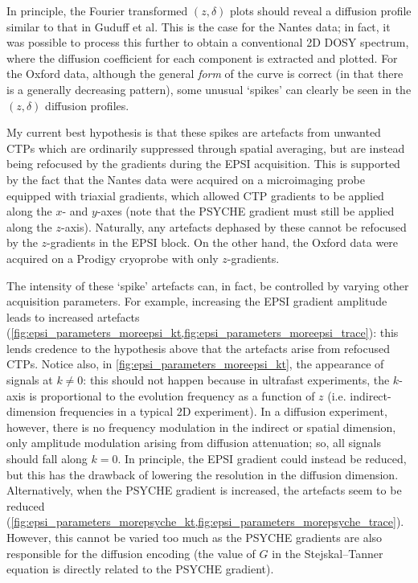 In principle, the Fourier transformed $(z, \delta)$ plots should reveal a diffusion profile similar to that in Guduff et al.\autocite{Guduff2017CC}
This is the case for the Nantes data; in fact, it was possible to process this further to obtain a conventional 2D DOSY spectrum, where the diffusion coefficient for each component is extracted and plotted.
For the Oxford data, although the general \textit{form} of the curve is correct (in that there is a generally decreasing pattern), some unusual `spikes' can clearly be seen in the $(z,\delta)$ diffusion profiles.

My current best hypothesis is that these spikes are artefacts from unwanted CTPs which are ordinarily suppressed through spatial averaging, but are instead being refocused by the gradients during the EPSI acquisition.
This is supported by the fact that the Nantes data were acquired on a microimaging probe equipped with triaxial gradients, which allowed CTP gradients to be applied along the $x$- and $y$-axes (note that the PSYCHE gradient must still be applied along the $z$-axis).
Naturally, any artefacts dephased by these cannot be refocused by the $z$-gradients in the EPSI block.
On the other hand, the Oxford data were acquired on a Prodigy cryoprobe with only $z$-gradients.

The intensity of these `spike' artefacts can, in fact, be controlled by varying other acquisition parameters.
For example, increasing the EPSI gradient amplitude leads to increased artefacts (\cref{fig:epsi_parameters_moreepsi_kt,fig:epsi_parameters_moreepsi_trace}): this lends credence to the hypothesis above that the artefacts arise from refocused CTPs.
Notice also, in \cref{fig:epsi_parameters_moreepsi_kt}, the appearance of signals at $k \neq 0$: this should not happen because in ultrafast experiments, the $k$-axis is proportional to the evolution frequency as a function of $z$ (i.e. indirect-dimension frequencies in a typical 2D experiment).
In a diffusion experiment, however, there is no frequency modulation in the indirect or spatial dimension, only amplitude modulation arising from diffusion attenuation; so, all signals should fall along $k = 0$.
In principle, the EPSI gradient could instead be reduced, but this has the drawback of lowering the resolution in the diffusion dimension.
Alternatively, when the PSYCHE gradient is increased, the artefacts seem to be reduced (\cref{fig:epsi_parameters_morepsyche_kt,fig:epsi_parameters_morepsyche_trace}).
However, this cannot be varied too much as the PSYCHE gradients are also responsible for the diffusion encoding (the value of $G$ in the Stejskal--Tanner equation is directly related to the PSYCHE gradient).

